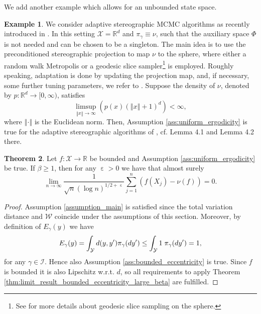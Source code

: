 \documentclass[12pt]{article}
\theoremstyle{definition}
\newtheorem{thm}{Theorem}[section]
\newtheorem{example}[thm]{Example}
\renewcommand{\d}{{\rm d}}
\newcommand{\norm}[1]{\left\Vert #1 \right\Vert}
\newcommand{\R}{\mathbb{R}}
\newcommand{\cX}{\mathcal{X}}
\newcommand{\cY}{\mathcal{Y}}
\DeclareMathOperator{\eps}{\varepsilon}
\begin{document}
We add another example which allows for an unbounded state space.
	\begin{example}\label{ex:Metropolis_geometric_ergodic}
		We consider adaptive stereographic MCMC algorithms as recently introduced in \cite{bell2025adaptivestereographicmcmc}. 
		In this setting $\cX  = \R^d$ and $\pi_\gamma \equiv \nu$, such that the auxiliary space $\Phi$ is not needed and can be chosen to be a singleton. 
		The main idea is to use the preconditioned stereographic projection to map $\nu$ to the sphere, where either a random walk Metropolis or a geodesic slice sampler\footnote{{See \cite{habeck2024geodesicslicesamplingsphere} for more details about geodesic slice sampling on the sphere.}} is employed.  
		Roughly speaking, adaptation is done by updating the projection map, and, if necessary, some further tuning parameters, we refer to \cite{bell2025adaptivestereographicmcmc}. 
		Suppose the density of $\nu$, denoted by $p\colon \R^d \to [0, \infty)$, satisfies 
		\[
		\limsup_{\norm{x} \to \infty}\left(p(x) (\norm{x}+1)^d \right) < \infty, 
		\]
		where $\norm{\cdot}$ is the Euclidean norm. Then, Assumption \ref{ass:uniform_ergodicity} is true for the adaptive stereographic algorithms of \cite{bell2025adaptivestereographicmcmc}, cf. Lemma 4.1 and Lemma 4.2 there.  
	\end{example}



\begin{thm}\label{thm:convergence_uniform_ergodic_case}
	Let $f \colon \cX \to \R$ be bounded and Assumption \ref{ass:uniform_ergodicity} be true. 
	If $\beta\geq 1$, then for any $\eps>0$ we have that almost surely 
	\[
	\lim_{n \to \infty}\frac{1}{\sqrt{n}(\log n )^{1/2+\eps}} \sum_{j=1}^n \left( f(X_j) - \nu(f)\right) =0.
	\]
\end{thm}

\begin{proof}
	Assumption \ref{assumption_main} is satisfied since the total variation distance and $\mathcal{W}$ coincide under the assumptions of this section. 
	Moreover, by definition of $E_\gamma(y)$ we have
	\[
	E_\gamma(y) = \int_\cY d(y, y') \pi_\gamma (\d y') \leq \int_\cY 1 \; \pi_\gamma(\d y') = 1,
	\]
	for any $\gamma \in \mathcal{I}$. 
	Hence also Assumption \ref{ass:bounded_eccentricity} is true. 
	Since $f$ is bounded it is also Lipschitz w.r.t. $d$, so all requirements to apply Theorem \ref{thm:limit_result_bounded_eccentricity_large_beta} are fulfilled. 
\end{proof}
\end{document}
